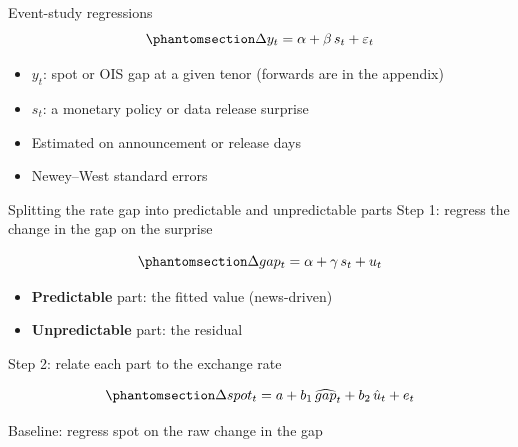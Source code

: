 \documentclass[
  ignorenonframetext,
  aspectratio=141,
]{beamer}
\providecommand{\tightlist}{%
  \setlength{\itemsep}{0pt}\setlength{\parskip}{0pt}}\usepackage{longtable,booktabs,array}
\begin{document}
\begin{frame}{Event-study regressions}
\label{event-study-regressions}
\begin{equation}\phantomsection\label{eq-event}{\Delta y_t = \alpha + \beta \, s_t + \varepsilon_t}\end{equation}

\begin{itemize}
\tightlist
\item
  \(y_t\): spot or OIS gap at a given tenor (forwards are in the
  appendix)
\item
  \(s_t\): a monetary policy or data release surprise
\item
  Estimated on announcement or release days
\item
  Newey--West standard errors
\end{itemize}
\end{frame}

\begin{frame}{Splitting the rate gap into predictable and unpredictable
parts}
\label{splitting-the-rate-gap-into-predictable-and-unpredictable-parts}
Step 1: regress the change in the gap on the surprise

\begin{equation}\phantomsection\label{eq-first}{\Delta gap_t = \alpha + \gamma \, s_t + u_t}\end{equation}

\begin{itemize}
\tightlist
\item
  \textbf{Predictable} part: the fitted value (news-driven)
\item
  \textbf{Unpredictable} part: the residual
\end{itemize}

Step 2: relate each part to the exchange rate

\begin{equation}\phantomsection\label{eq-second}{\Delta spot_t = a + b_1 \, \widehat{gap}_t + b_2 \, \hat{u}_t + e_t}\end{equation}

Baseline: regress spot on the raw change in the gap
\end{frame}
\end{document}
